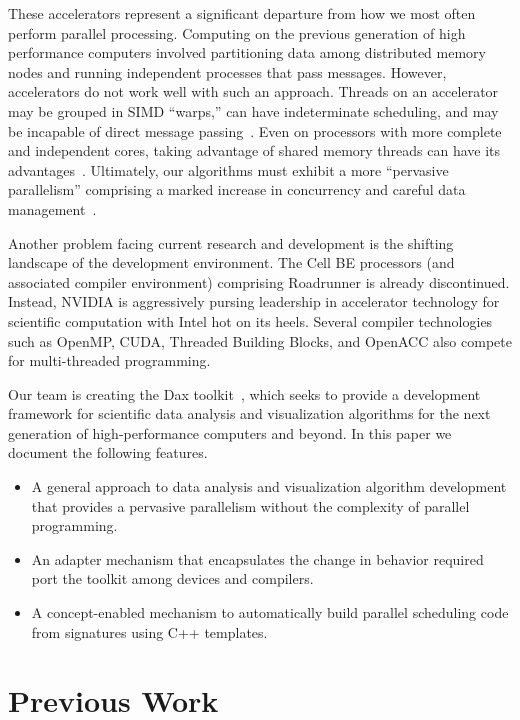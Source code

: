 \documentclass[conference]{IEEEtran}
\newcommand*{\lcite}[1]{~\cite{#1}}
\begin{document}
These accelerators represent a significant departure from how we most often
perform parallel processing.  Computing on the previous generation of high
performance computers involved partitioning data among distributed memory
nodes and running independent processes that pass messages.  However,
accelerators do not work well with such an approach.  Threads on an
accelerator may be grouped in SIMD ``warps,'' can have indeterminate
scheduling, and may be incapable of direct message passing\lcite{Sanders2011}.
Even on processors with more complete and independent cores, taking
advantage of shared memory threads can have its
advantages\lcite{Camp2010,Howison2011}.  Ultimately, our algorithms must
exhibit a more ``pervasive parallelism'' comprising a marked increase in
concurrency and careful data
management\lcite{ScientificDiscoveryExascale2011,ExascaleRoadMap}.

Another problem facing current research and development is the shifting
landscape of the development environment.  The Cell BE processors (and
associated compiler environment) comprising Roadrunner is already
discontinued.  Instead, NVIDIA is aggressively pursing leadership in
accelerator technology for scientific computation with Intel hot on its
heels.  Several compiler technologies such as OpenMP, CUDA, Threaded
Building Blocks, and OpenACC also compete for multi-threaded programming.

Our team is creating the Dax toolkit\lcite{Moreland2011:LDAV}, which seeks
to provide a development framework for scientific data analysis and
visualization algorithms for the next generation of high-performance
computers and beyond.  In this paper we document the following features.
\begin{itemize}
\item A general approach to data analysis and visualization algorithm
  development that provides a pervasive parallelism without the complexity
  of parallel programming.
\item An adapter mechanism that encapsulates the change in behavior
  required port the toolkit among devices and compilers.
\item A concept-enabled mechanism to automatically build parallel
  scheduling code from signatures using C++ templates.
\end{itemize}

\section{Previous Work}
\label{sec:PreviousWork}
\end{document}
